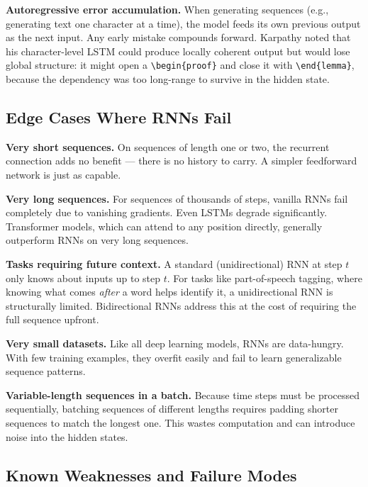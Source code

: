 \textbf{Autoregressive error accumulation.}
When generating sequences (e.g., generating text one character at a time), the model
feeds its own previous output as the next input. Any early mistake compounds forward.
Karpathy noted that his character-level LSTM could produce locally coherent output but
would lose global structure: it might open a \verb|\begin{proof}| and close it with
\verb|\end{lemma}|, because the dependency was too long-range to survive in the hidden
state.

\subsection{Edge Cases Where RNNs Fail}

\textbf{Very short sequences.}
On sequences of length one or two, the recurrent connection adds no benefit --- there
is no history to carry. A simpler feedforward network is just as capable.

\textbf{Very long sequences.}
For sequences of thousands of steps, vanilla RNNs fail completely due to vanishing
gradients. Even LSTMs degrade significantly. Transformer models, which can attend to
any position directly, generally outperform RNNs on very long sequences.

\textbf{Tasks requiring future context.}
A standard (unidirectional) RNN at step $t$ only knows about inputs up to step $t$.
For tasks like part-of-speech tagging, where knowing what comes \textit{after} a word
helps identify it, a unidirectional RNN is structurally limited. Bidirectional RNNs
address this at the cost of requiring the full sequence upfront.

\textbf{Very small datasets.}
Like all deep learning models, RNNs are data-hungry. With few training examples, they
overfit easily and fail to learn generalizable sequence patterns.

\textbf{Variable-length sequences in a batch.}
Because time steps must be processed sequentially, batching sequences of different
lengths requires padding shorter sequences to match the longest one. This wastes
computation and can introduce noise into the hidden states.

\subsection{Known Weaknesses and Failure Modes}


